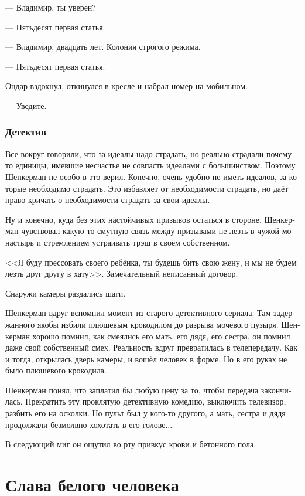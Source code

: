 \documentclass[a5paper,12pt,fleqn]{extbook}\usepackage{cooltooltips}\usepackage{polyglossia}\setdefaultlanguage[babelshorthands=true]{russian}\setotherlanguage{english}\defaultfontfeatures{Ligatures=TeX,Mapping=tex-text} \usepackage{xcolor}\definecolor{lightgray}{HTML}{bbbbbb}\color{lightgray}\newcommand{\ml}[3]{\textenglish{\textcolor{black}{#3}}}
\begin{document}
--- Владимир, ты уверен?

--- Пятьдесят первая статья.

--- Владимир, двадцать лет.
Колония строгого режима.

--- Пятьдесят первая статья.

Ондар вздохнул, откинулся в кресле и набрал номер на мобильном.

--- Уведите.

\subsection{Детектив}

Все вокруг говорили, что за идеалы надо страдать, но реально страдали почему-то единицы, имевшие несчастье не совпасть идеалами с большинством.
Поэтому Шенкерман не особо в это верил.
Конечно, очень удобно не иметь идеалов, за которые необходимо страдать.
Это избавляет от необходимости страдать, но даёт право кричать о необходимости страдать за свои идеалы.

Ну и конечно, куда без этих настойчивых призывов остаться в стороне.
Шенкерман чувствовал какую-то смутную связь между призывами не лезть в чужой монастырь и стремлением устраивать трэш в своём собственном.

<<Я буду прессовать своего ребёнка, ты будешь бить свою жену, и мы не будем лезть друг другу в хату>>.
Замечательный неписанный договор.

Снаружи камеры раздались шаги.

Шенкерман вдруг вспомнил момент из старого детективного сериала.
Там задержанного якобы избили плюшевым крокодилом до разрыва мочевого пузыря.
Шенкерман хорошо помнил, как смеялись его мать, его дядя, его сестра, он помнил даже свой собственный смех.
Реальность вдруг превратилась в телепередачу.
Как и тогда, открылась дверь камеры, и вошёл человек в форме.
Но в его руках не было плюшевого крокодила.

Шенкерман понял, что заплатил бы любую цену за то, чтобы передача закончилась.
Прекратить эту проклятую детективную комедию, выключить телевизор, разбить его на осколки.
Но пульт был у кого-то другого, а мать, сестра и дядя продолжали безмолвно хохотать в его голове...

В следующий миг он ощутил во рту привкус крови и бетонного пола.

\chapter{Слава белого человека}
\end{document}
